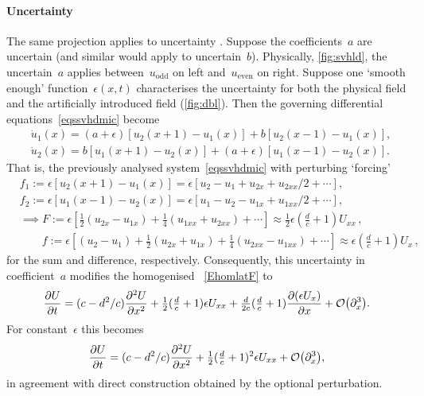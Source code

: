 \paragraph{Uncertainty}  
The same projection applies to uncertainty
\cite[\S12.4]{Roberts2014a}.  Suppose the coefficients~\(a\)
are uncertain (and similar would apply to uncertain~\(b\)). 
Physically, \cref{fig:svhld}, the uncertain~\(a\) applies
between~\(u_{\text{odd}}\) on left and~\(u_{\text{even}}\)
on right.  Suppose one `smooth enough'
function~\(\epsilon(x,t)\) characterises the uncertainty for
both the physical field and the artificially introduced
field (\cref{fig:dbl}).  Then the governing differential
equations~\cref{eqssvhdmic} become
\begin{subequations}\label{EEsvhdmic}%
\begin{align}&
\dot u_1(x)=(a+\epsilon)[u_2(x+1)-u_1(x)] +b[u_2(x-1)-u_1(x)],
\\&
\dot u_2(x)=b[u_1(x+1)-u_2(x)] +(a+\epsilon)[u_1(x-1)-u_2(x)].
\end{align}
\end{subequations}
That is, the previously analysed system~\cref{eqssvhdmic}
with perturbing `forcing' \begin{align*}&
f_1:=\epsilon[u_2(x+1)-u_1(x)]=\epsilon[u_2-u_1+u_{2x}+u_{2xx}/2+\cdots],
\\&
f_2:=\epsilon[u_1(x-1)-u_2(x)]=\epsilon[u_1-u_2-u_{1x}+u_{1xx}/2+\cdots],
\\&\implies
F:=\epsilon\left[\tfrac12(u_{2x}-u_{1x})+\tfrac14(u_{1xx}+u_{2xx})+\cdots\right]
\approx \tfrac12\epsilon(\tfrac dc+1) U_{xx}\,,
\\&\qquad
f:=\epsilon[(u_2-u_1) +\tfrac12(u_{2x}+u_{1x}) +\tfrac14(u_{2xx}-u_{1xx})+\cdots]
\approx \epsilon(\tfrac dc+1) U_{x}\,,
\end{align*}
for the sum and difference, respectively. Consequently, this
uncertainty in coefficient~\(a\) modifies the homogenised
\pde~\cref{EhomlatF} to   
\begin{equation}
\D tU= (c-d^2/c)\DD xU +\tfrac12(\tfrac dc+1)\epsilon U_{xx} +\tfrac d{2c}(\tfrac dc+1)\D x{(\epsilon U_{x})} 
 +\Ord{\partial_x^3}.
\label{EhomlatUn}
\end{equation}
For constant~\(\epsilon\) this becomes
\begin{equation*}
\D tU= (c-d^2/c)\DD xU +\tfrac12(\tfrac dc+1)^2\epsilon U_{xx}  
 +\Ord{\partial_x^3},
\end{equation*}
in agreement with direct construction obtained by the
optional perturbation. 

